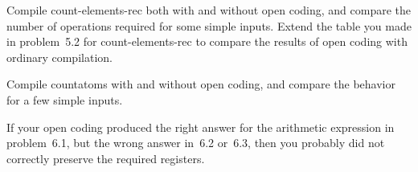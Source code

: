  Compile {\cf count-elements-rec} both with and without
open coding, and compare the number of operations required for some simple
inputs.  Extend the table you made in problem~5.2 for {\cf count-elements-rec}
to compare the results of open coding with ordinary compilation.

 Compile {\cf countatoms} with and without open
coding, and compare the behavior for a few simple inputs.

 If your open coding produced the right answer
for the arithmetic expression in problem~6.1, but the wrong answer in~6.2
or~6.3, then you probably did not correctly preserve the required registers.




